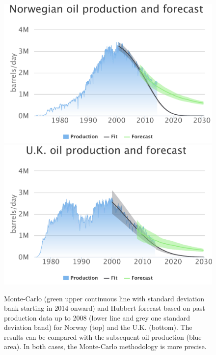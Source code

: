 \documentclass[review]{elsarticle}
\begin{document}
\noindent 
\begin{figure}[H]
\includegraphics[width=1\columnwidth]{NO-back-test}
\includegraphics[width=1\columnwidth]{UK-back-test} \caption{Monte-Carlo (green upper
continuous line with standard deviation bank starting in 2014 onward) and Hubbert forecast based 
on past production data up to 2008 (lower line and grey one standard deviation band)
for Norway (top) and the U.K. (bottom). The results can be
compared with the subsequent oil production (blue area). In both cases,
the Monte-Carlo methodology is more precise.}
\label{model-back-testing} 
\end{figure}

\pagebreak

\end{document}
